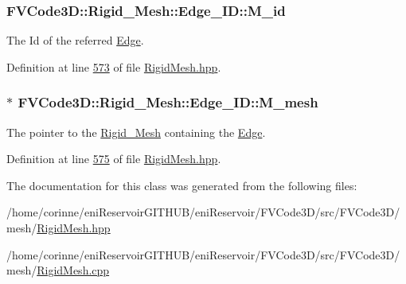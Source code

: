 \subsubsection[{\texorpdfstring{M\+\_\+id}{M_id}}]{ F\+V\+Code3\+D\+::\+Rigid\+\_\+\+Mesh\+::\+Edge\+\_\+\+I\+D\+::\+M\+\_\+id\hspace{0.3cm}{\ttfamily [protected]}}\hypertarget{classFVCode3D_1_1Rigid__Mesh_1_1Edge__ID_ad2b90debdaec4de3ba2258ed1ab04f6e}{}\label{classFVCode3D_1_1Rigid__Mesh_1_1Edge__ID_ad2b90debdaec4de3ba2258ed1ab04f6e}


The Id of the referred \hyperlink{classFVCode3D_1_1Rigid__Mesh_1_1Edge}{Edge}. 



Definition at line \hyperlink{RigidMesh_8hpp_source_l00573}{573} of file \hyperlink{RigidMesh_8hpp_source}{Rigid\+Mesh.\+hpp}.

\subsubsection[{\texorpdfstring{M\+\_\+mesh}{M_mesh}}]{$\ast$ F\+V\+Code3\+D\+::\+Rigid\+\_\+\+Mesh\+::\+Edge\+\_\+\+I\+D\+::\+M\+\_\+mesh\hspace{0.3cm}{\ttfamily [protected]}}\hypertarget{classFVCode3D_1_1Rigid__Mesh_1_1Edge__ID_ae24b58fc7aaf0faa1164935de641d753}{}\label{classFVCode3D_1_1Rigid__Mesh_1_1Edge__ID_ae24b58fc7aaf0faa1164935de641d753}


The pointer to the \hyperlink{classFVCode3D_1_1Rigid__Mesh}{Rigid\+\_\+\+Mesh} containing the \hyperlink{classFVCode3D_1_1Rigid__Mesh_1_1Edge}{Edge}. 



Definition at line \hyperlink{RigidMesh_8hpp_source_l00575}{575} of file \hyperlink{RigidMesh_8hpp_source}{Rigid\+Mesh.\+hpp}.



The documentation for this class was generated from the following files\+:\begin{DoxyCompactItemize}
\item 
/home/corinne/eni\+Reservoir\+G\+I\+T\+H\+U\+B/eni\+Reservoir/\+F\+V\+Code3\+D/src/\+F\+V\+Code3\+D/mesh/\hyperlink{RigidMesh_8hpp}{Rigid\+Mesh.\+hpp}\item 
/home/corinne/eni\+Reservoir\+G\+I\+T\+H\+U\+B/eni\+Reservoir/\+F\+V\+Code3\+D/src/\+F\+V\+Code3\+D/mesh/\hyperlink{RigidMesh_8cpp}{Rigid\+Mesh.\+cpp}\end{DoxyCompactItemize}
